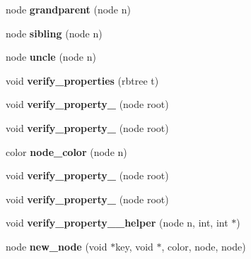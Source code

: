 \begin{DoxyCompactItemize}
\item 
\hypertarget{class_r_b_tree_a400d1f6ee22ee84f0eaa4f9277dd0a30}{}node {\bfseries grandparent} (node n)\label{class_r_b_tree_a400d1f6ee22ee84f0eaa4f9277dd0a30}

\item 
\hypertarget{class_r_b_tree_abcb191cea5e9645e9aebb17e8fb6f459}{}node {\bfseries sibling} (node n)\label{class_r_b_tree_abcb191cea5e9645e9aebb17e8fb6f459}

\item 
\hypertarget{class_r_b_tree_a7a8df15a6f435312f6b42fc379423a88}{}node {\bfseries uncle} (node n)\label{class_r_b_tree_a7a8df15a6f435312f6b42fc379423a88}

\item 
\hypertarget{class_r_b_tree_a65f2b9fb6456c1e6eb818964a9bb191c}{}void {\bfseries verify\+\_\+properties} (rbtree t)\label{class_r_b_tree_a65f2b9fb6456c1e6eb818964a9bb191c}

\item 
\hypertarget{class_r_b_tree_aa847298039b69b38dbdca944b4374483}{}void {\bfseries verify\+\_\+property\+\_} (node root)\label{class_r_b_tree_aa847298039b69b38dbdca944b4374483}

\item 
\hypertarget{class_r_b_tree_a3ea8197d0d76ae95b2c189b219bde9ef}{}void {\bfseries verify\+\_\+property\+\_} (node root)\label{class_r_b_tree_a3ea8197d0d76ae95b2c189b219bde9ef}

\item 
\hypertarget{class_r_b_tree_af0021e0d85b14a21e4c8e1fc1ec98355}{}color {\bfseries node\+\_\+color} (node n)\label{class_r_b_tree_af0021e0d85b14a21e4c8e1fc1ec98355}

\item 
\hypertarget{class_r_b_tree_ac04878f0c0901928790835dafabdc773}{}void {\bfseries verify\+\_\+property\+\_} (node root)\label{class_r_b_tree_ac04878f0c0901928790835dafabdc773}

\item 
\hypertarget{class_r_b_tree_a05f14266a4743861d17587d66aa44b65}{}void {\bfseries verify\+\_\+property\+\_} (node root)\label{class_r_b_tree_a05f14266a4743861d17587d66aa44b65}

\item 
\hypertarget{class_r_b_tree_af58095a7f4c27cd3b64201ce9ac22260}{}void {\bfseries verify\+\_\+property\+\_\+\_\+helper} (node n, int, int $\ast$)\label{class_r_b_tree_af58095a7f4c27cd3b64201ce9ac22260}

\item 
\hypertarget{class_r_b_tree_a6be6052010963ffac280ef822f0f1801}{}node {\bfseries new\+\_\+node} (void $\ast$key, void $\ast$, color, node, node)\label{class_r_b_tree_a6be6052010963ffac280ef822f0f1801}


\end{DoxyCompactItemize}
